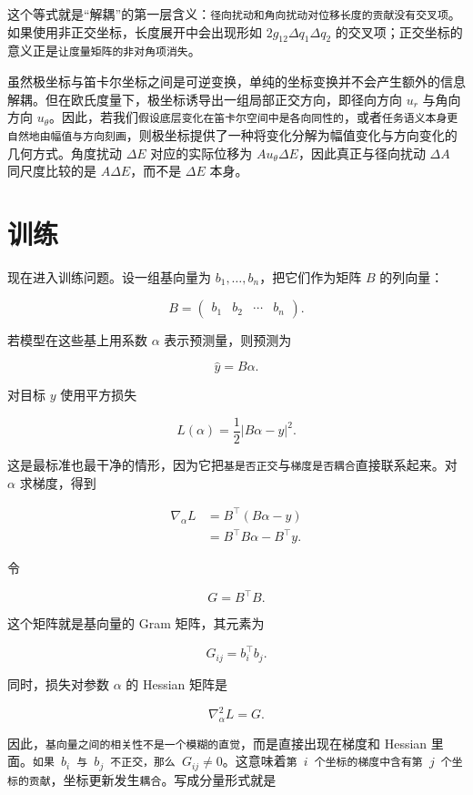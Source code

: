 这个等式就是“解耦”的第一层含义：\verb|径向扰动和角向扰动对位移长度的贡献没有交叉项|。如果使用非正交坐标，长度展开中会出现形如 \(2g_{12}\Delta q_1\Delta q_2\) 的交叉项；正交坐标的意义正是\verb|让度量矩阵的非对角项消失|。

虽然极坐标与笛卡尔坐标之间是可逆变换，单纯的坐标变换并不会产生额外的信息解耦。但在欧氏度量下，极坐标诱导出一组局部正交方向，即径向方向 \(u_r\) 与角向方向 \(u_\theta\)。因此，若我们\verb|假设底层变化在笛卡尔空间中是各向同性的|，或者\verb|任务语义本身更自然地由幅值与方向刻画|，则极坐标提供了一种将变化分解为幅值变化与方向变化的几何方式。角度扰动 \(\Delta E\) 对应的实际位移为 \(A u_\theta \Delta E\)，因此真正与径向扰动 \(\Delta A\) 同尺度比较的是 \(A\Delta E\)，而不是 \(\Delta E\) 本身。

\section{训练}

现在进入训练问题。设一组基向量为 \(b_1,\ldots,b_n\)，把它们作为矩阵 \(B\) 的列向量：

\[
B=\begin{pmatrix} b_1 & b_2 & \cdots & b_n \end{pmatrix}.
\]

若模型在这些基上用系数 \(\alpha\) 表示预测量，则预测为

\[
\hat y=B\alpha.
\]

对目标 \(y\) 使用平方损失

\[
L(\alpha)=\frac{1}{2}|B\alpha-y|^2.
\]

这是最标准也最干净的情形，因为它把\verb|基是否正交|与\verb|梯度是否耦合|直接联系起来。对 \(\alpha\) 求梯度，得到

\begin{align}
\nabla_\alpha L
&=B^\top(B\alpha-y) \\
&=B^\top B\alpha-B^\top y.
\end{align}

令

\[
G=B^\top B.
\]

这个矩阵就是基向量的 Gram 矩阵，其元素为

\[
G_{ij}=b_i^\top b_j.
\]

同时，损失对参数 \(\alpha\) 的 Hessian 矩阵是

\[
\nabla_\alpha^2 L=G.
\]

因此，\verb|基向量之间的相关性不是一个模糊的直觉|，而是直接出现在梯度和 Hessian 里面。\texttt{如果 \(b_i\) 与 \(b_j\) 不正交，那么 \(G_{ij}\neq 0\)}。这意味着\texttt{第 \(i\) 个坐标的梯度中含有第 \(j\) 个坐标的贡献}，坐标更新发生\verb|耦合|。写成分量形式就是

